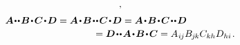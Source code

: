 \begin{equation}
\begin{gathered}
\hspace{.1ex} ,
\\[.15em]
%
\begin{multlined}
\bm{A} \hspace{-0.1ex}\narrowdotdotp \bm{B} \narrowdotp \bm{C} \narrowdotp \bm{D}
= \bm{A} \narrowdotp \bm{B} \narrowdotdotp \bm{C} \narrowdotp \bm{D}
= \bm{A} \narrowdotp \bm{B} \narrowdotp \bm{C} \narrowdotdotp \bm{D} \hspace*{4em} \\
= \bm{D} \narrowdotdotp \bm{A} \narrowdotp \bm{B} \narrowdotp \bm{C}
= A_{\hspace{.1ex}i\hspace{-0.1ex}j} B_{\hspace{-0.1ex}j\hspace{-0.1ex}k} C_{kh} D_{hi}
\hspace{.2ex} .
\end{multlined}
\end{gathered}
\end{equation}
